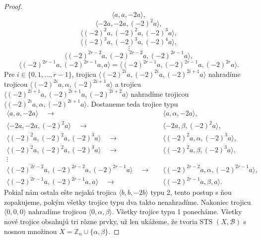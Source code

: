 \begin{proof}
	$$\langle              a,              a,  -2          a \rangle,$$
	$$\langle  -2          a,  -2          a, (-2)^2       a \rangle,$$
	$$\langle (-2)^2       a, (-2)^2       a, (-2)^3       a \rangle,$$
	$$\langle (-2)^3       a, (-2)^3       a, (-2)^4       a \rangle,$$
	$$\vdots$$
	$$\langle (-2)^{2r - 2}a, (-2)^{2r - 2}a, (-2)^{2r - 1}a \rangle,$$
	$$\langle (-2)^{2r - 1}a, (-2)^{2r - 1}a,              a \rangle = \langle (-2)^{2r - 1}a, (-2)^{2r - 1}a, (-2)^{2r}a \rangle.$$
	Pre $i \in \{0, 1, \dots, r-1\}$, trojicu $\langle (-2)^{2i}a, (-2)^{2i}a, (-2)^{2i + 1}a \rangle$ nahradíme trojicou $\langle (-2)^{2i}a, \alpha, (-2)^{2i + 1}a \rangle$ a trojicu $\langle (-2)^{2i + 1}a, (-2)^{2i + 1}a, (-2)^{2i + 2}a \rangle$ nahradíme trojicou $\langle (-2)^{2i}a, \alpha, (-2)^{2i + 1}a \rangle$. Dostaneme teda trojice typu
	\begin{align*}
	\langle              a,              a,  -2          a \rangle \quad \rightarrow& \quad \langle              a,         \alpha,  -2          a \rangle,\\
	\langle  -2          a,  -2          a, (-2)^2       a \rangle \quad \rightarrow& \quad \langle  -2          a,          \beta, (-2)^2       a \rangle,\\
	\langle (-2)^2       a, (-2)^2       a, (-2)^3       a \rangle \quad \rightarrow& \quad \langle (-2)^2       a,         \alpha, (-2)^3       a \rangle,\\
	\langle (-2)^2       a, (-2)^2       a, (-2)^3       a \rangle \quad \rightarrow& \quad \langle (-2)^2       a,          \beta, (-2)^3       a \rangle,\\
	\vdots&\\
	\langle (-2)^{2r - 2}a, (-2)^{2r - 2}a, (-2)^{2r - 1}a \rangle \quad \rightarrow& \quad \langle (-2)^{2r - 2}a,         \alpha, (-2)^{2r - 1}a \rangle,\\
	\langle (-2)^{2r - 1}a, (-2)^{2r - 1}a,              a \rangle \quad \rightarrow& \quad \langle (-2)^{2r - 1}a,          \beta,              a \rangle.
	\end{align*}
	Pokiaľ nám ostala ešte nejaká trojica $\langle b, b, -2b \rangle$ typu 2, tento postup s ňou zopakujeme, pokým všetky trojice typu dva takto nenahradíme.
	Nakoniec trojicu $\langle 0, 0, 0 \rangle$ nahradíme trojicou $\langle 0, \alpha, \beta \rangle$. Všetky trojice typu 1 ponecháme. Všetky nové trojice obsahujú tri rôzne prvky, už len ukážeme, že tvoria STS $(X, \mathcal{B})$ s nosnou množinou $X = \mathbb{Z}_n \cup \{\alpha, \beta \}$.
	

\end{proof}
